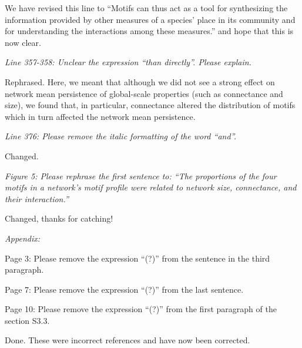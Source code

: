 \documentclass[12pt]{article}
\newcommand{\us}{\rm \setlength{\leftskip}{0.3cm} \setlength{\rightskip}{0.3cm}}
\newcommand{\them}{\it \setlength{\leftskip}{0cm} \setlength{\rightskip}{0cm}}
\begin{document}
        \us We have revised this line to ``Motifs can thus act as a tool for synthesizing the information provided by other measures of a species' place in its community and for understanding the interactions among these measures.'' and hope that this is now clear.
        
        \them
        Line 357-358: Unclear the expression ``than directly''. Please explain.
        
        \us
        Rephrased. Here, we meant that although we did not see a strong effect on network mean persistence of global-scale properties (such as connectance and size), we found that, in particular, connectance altered the distribution of motifs which in turn affected the network mean persistence.  
        
        \them
        Line 376: Please remove the italic formatting of the word ``and''.
        
        \us
        Changed.
        
        \them
        Figure 5: Please rephrase the first sentence to: ``The proportions of the four motifs in a network's motif profile were related to network size, connectance, and their interaction.''
        
        \us
        Changed, thanks for catching!
        
        \them
        Appendix:
        
        Page 3: Please remove the expression ``(?)'' from the sentence in the third paragraph.
        
        Page 7: Please remove the expression ``(?)'' from the last sentence.
        
        Page 10: Please remove the expression ``(?)'' from the first paragraph of the section S3.3.
        
        \us
        Done. These were incorrect references and have now been corrected.

\clearpage


\end{document}
